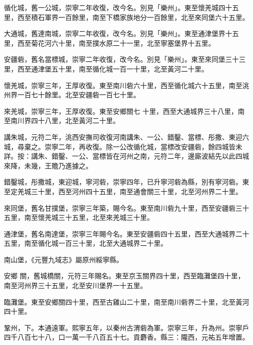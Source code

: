 \begin{pinyinscope}
 循化城，舊一公城，崇寧二年收復，改今名。別見「樂州」。東至懷羌城四十五里，西至積石軍界一百餘里，南至下橋家族地分一百餘里，北至來同堡六十五里。



 大通城，舊達南城，崇寧二年收復，改今名。別見「樂州」。東至通津堡界十五里，西至菊花河六十里，南至撲水原二十一里，北至寧塞堡界十五里。



 安疆砦，舊名當標城，崇寧二年收復，改今名。別見「樂州」。東至來同堡三十三里，西至通津堡五十里，南至循化城一百一十里，北至黃河二十里。



 懷羌城，崇寧三年，王厚收復。東至南川砦六十里，西至循化城六十五里，南至洮州界一百七十餘里。北至安疆砦一百七十里。



 來羌城，崇寧三年，王厚收復。東至安鄉關七
 十里，西至大通城界三十八里，南至南川界四十八里，北至黃河二十里。



 講朱城，元符二年，洮西安撫司收復河南講朱、一公、錯鑿、當標、彤撒、東迎六城，尋棄之。崇寧二年，再收復。除一公改循化城，當標改安疆砦，餘四城皆未詳。按：講朱、錯鑿、一公、當標皆在河州之南，元符二年，邊廝波結先以此四城來降，未幾，王贍乃進據之。



 錯鑿城，彤撒城，東迎城，寧河砦，崇寧四年，已升寧河砦為縣，別有寧河砦。東至定羌城三十里，西至河州四十五里，南至通會關三十里，北至河州界二十里。



 來同堡，舊名甘撲堡，崇寧三年築，賜今名。東至南川砦九十里，西至安疆砦三十五里，南至懷羌城三十五里，北至來羌城三十里。



 通津堡，舊名南達堡，崇寧三年賜今名。東至安疆砦四十五里，西至大通城界二十五里，南至循化城一百三十里，北至大通城界二十里。



 南山堡，《元豐九域志》屬原州綏寧縣。



 安鄉
 關，舊城橋關，元符三年賜名。東至京玉關界四十里，西至臨灘堡四十里，南至河州界三十五里，北至安川堡界一十五里。



 臨灘堡。東至安鄉關四十里，西至古雞山二十里，南至南川砦界二十里，北至黃河四十里。



 鞏州，下。本通遠軍。熙寧五年，以秦州古渭砦為軍。崇寧三年，升為州。崇寧戶四千八百七十八，口一萬一千八百五十七。貢麝香。縣三：隴西，元祐五年增置。




\end{pinyinscope}
